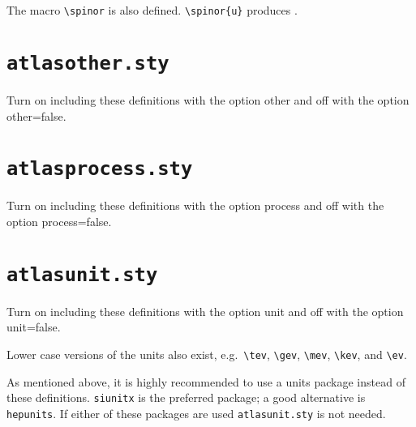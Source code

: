 \documentclass[UKenglish,texlive=2013]{\ATLASLATEXPATH atlasdoc}
\newcommand{\File}[1]{\texttt{#1}\xspace}
\newcommand{\Macro}[1]{\texttt{\textbackslash #1}\xspace}
\newcommand{\Option}[1]{\textsf{#1}\xspace}
\newcommand{\Package}[1]{\texttt{#1}\xspace}
\begin{document}
{

\noindent The macro \Macro{spinor} is also defined.
\verb|\spinor{u}| produces .


\newpage
\section{\File{atlasother.sty}}

Turn on including these definitions with the option \Option{other} and off with the option \Option{other=false}.




\newpage
\section{\File{atlasprocess.sty}}

Turn on including these definitions with the option \Option{process} and off with the option \Option{process=false}.




\newpage
\section{\File{atlasunit.sty}}

Turn on including these definitions with the option \Option{unit} and off with the option \Option{unit=false}.



\noindent Lower case versions of the units also exist, e.g.\ \verb|\tev|, \verb|\gev|, \verb|\mev|, \verb|\kev|, and
\verb|\ev|. 

As mentioned above, it is highly recommended to use a units package instead of
these definitions. \Package{siunitx} is the preferred package; a good alternative is \Package{hepunits}.
If either of these packages are used \File{atlasunit.sty} is not needed.

}
\end{document}
